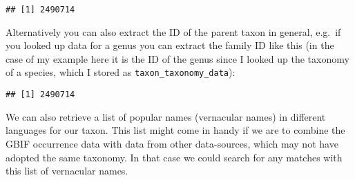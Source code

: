 \documentclass[]{article}
\newenvironment{Shaded}{\begin{snugshade}}{\end{snugshade}}
\newcommand{\DecValTok}[1]{\textcolor[rgb]{0.00,0.00,0.81}{#1}}
\newcommand{\NormalTok}[1]{#1}
\newcommand{\OperatorTok}[1]{\textcolor[rgb]{0.81,0.36,0.00}{\textbf{#1}}}
\newcommand{\StringTok}[1]{\textcolor[rgb]{0.31,0.60,0.02}{#1}}
\begin{document}
\begin{verbatim}
## [1] 2490714
\end{verbatim}

Alternatively you can also extract the ID of the parent taxon in
general, e.g.~if you looked up data for a genus you can extract the
family ID like this (in the case of my example here it is the ID of the
genus since I looked up the taxonomy of a species, which I stored as
\texttt{taxon\_taxonomy\_data}):

\begin{Shaded}
\end{Shaded}

\begin{verbatim}
## [1] 2490714
\end{verbatim}

We can also retrieve a list of popular names (vernacular names) in
different languages for our taxon. This list might come in handy if we
are to combine the GBIF occurrence data with data from other
data-sources, which may not have adopted the same taxonomy. In that case
we could search for any matches with this list of vernacular names.

\begin{Shaded}
\end{Shaded}
\end{document}
